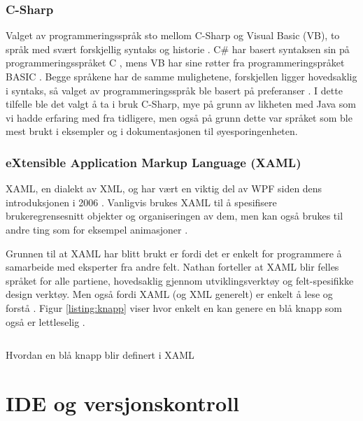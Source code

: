 \subsubsection{C-Sharp} 

Valget av programmeringsspråk sto mellom C-Sharp og Visual Basic (VB), to språk med svært forskjellig syntaks og historie \cite{Compa6:online}. C# har basert syntaksen sin på programmeringsspråket C , mens VB har sine røtter fra programmeringspråket BASIC \cite{Visua3:online} \cite{About8:online}. Begge språkene har de samme mulighetene, forskjellen ligger hovedsaklig i syntaks, så valget av programmeringsspråk ble basert på preferanser \cite{What0:online}. I dette tilfelle ble det valgt å ta i bruk C-Sharp, mye på grunn av likheten med Java som vi hadde erfaring med fra tidligere, men også på grunn dette var språket som ble mest brukt i eksempler og i dokumentasjonen til øyesporingenheten.


\subsubsection{eXtensible Application Markup Language (XAML)} 

XAML, en dialekt av XML, og har vært en viktig del av WPF siden dens introduksjonen i 2006 \cite[p.~17]{WPFbook}. Vanligvis brukes XAML til å spesifisere brukeregrensesnitt objekter og organiseringen av dem, men kan også brukes til andre ting som for eksempel animasjoner \cite{Story5:online}. 

Grunnen til at XAML har blitt brukt er fordi det er enkelt for programmere å samarbeide med eksperter fra andre felt. Nathan forteller at XAML blir felles språket for alle partiene, hovedsaklig gjennom utviklingsverktøy og felt-spesifikke design verktøy. Men også fordi XAML (og XML generelt) er enkelt å lese og forstå \cite[p.~17]{WPFbook}. Figur \ref{listing:knapp} viser hvor enkelt en kan genere en blå knapp som også er lettleselig .


\begin{listing}[ht] 
\inputminted[fontsize=\footnotesize, frame=lines,framesep=2mm,baselinestretch=1.2,bgcolor=lightgray,linenos]{xml}{Code/xamlexample.xml} 
\caption{Hvordan en blå knapp blir definert i XAML} 
\label{listing:knapp} 
\end{listing} 
 
   
\section{IDE og versjonskontroll} 

